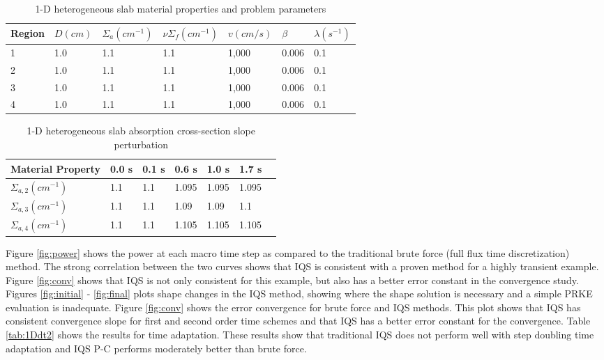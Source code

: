 \documentclass[10pt]{scrartcl}
\begin{document}
\begin{table}[!htbp]
\begin{center}
\caption{1-D heterogeneous slab material properties and problem parameters}
\label{tab:1Dmat}
\begin{tabular}{lllllll}
\hline
Region & $D (cm)$ & $\Sigma_a (cm^{-1})$ & $\nu \Sigma_f (cm^{-1})$ & $v (cm/s)$ & $\beta$ & $\lambda (s^{-1})$ \\
\hline
1 & 1.0 & 1.1 & 1.1 & 1,000 & 0.006 & 0.1 \\
2 & 1.0 & 1.1 & 1.1 & 1,000 & 0.006 & 0.1 \\
3 & 1.0 & 1.1 & 1.1 & 1,000 & 0.006 & 0.1 \\
4 & 1.0 & 1.1 & 1.1 & 1,000 & 0.006 & 0.1 \\
\hline
\end{tabular}
\end{center}
\end{table}

\begin{table}[!htbp]
\begin{center}
\caption{1-D heterogeneous slab absorption cross-section slope perturbation}
\label{tab:1Dslope}
\begin{tabular}{lllllll}
\hline
Material Property & 0.0 s & 0.1 s & 0.6 s & 1.0 s & 1.7 s \\
\hline
$\Sigma_{a,2} (cm^{-1})$ & 1.1 & 1.1 & 1.095 & 1.095 & 1.095 \\
$\Sigma_{a,3} (cm^{-1})$ & 1.1 & 1.1 & 1.09 & 1.09 & 1.1 \\
$\Sigma_{a,4} (cm^{-1})$ & 1.1 & 1.1 & 1.105 & 1.105 & 1.105 \\
\hline
\end{tabular}
\end{center}
\end{table}



Figure \ref{fig:power} shows the power at each macro time step as compared to the traditional brute force (full flux time discretization) method.  The strong correlation between the two curves shows that IQS is consistent with a proven method for a highly transient example.  Figure \ref{fig:conv} shows that IQS is not only consistent for this example, but also has a better error constant in the convergence study.  Figures \ref{fig:initial} - \ref{fig:final} plots shape changes in the IQS method, showing where the shape solution is necessary and a simple PRKE evaluation is inadequate.  Figure \ref{fig:conv} shows the error convergence for brute force and IQS methods.  This plot shows that IQS has consistent convergence slope for first and second order time schemes and that IQS has a better error constant for the convergence.  Table \ref{tab:1Ddt2} shows the results for time adaptation.  These results show that traditional IQS does not perform well with step doubling time adaptation and IQS P-C performs moderately better than brute force.
\end{document}
